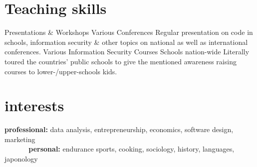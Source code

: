\documentclass[a4paper]{friggeri-cv} %
\begin{document}

\section{Teaching skills}

\begin{entrylist}
{Presentations \& Workshops}
{Various Conferences}
{Regular presentation on code in schools, information security \& other topics on national as well as international conferences.}
{Various Information Security Courses}
{Schools nation-wide}
{Literally toured the countries' public schools to give the mentioned awareness raising courses to lower-/upper-schools kids.}
\end{entrylist}


\section{interests}

\textbf{professional:} data analysis, entrepreneurship, economics, software design, marketing \\
\textbf{\ \ \ \ \ \ personal:} endurance sports, cooking, sociology, history, languages, japonology




\end{document}
